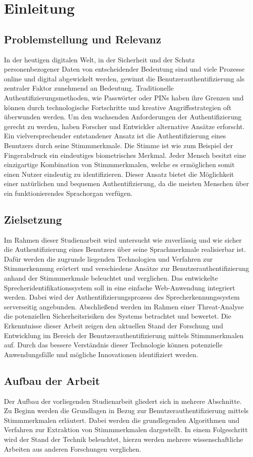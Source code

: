 \section{Einleitung}
\subsection{Problemstellung und Relevanz}
In der heutigen digitalen Welt, in der Sicherheit und der Schutz personenbezogener Daten von entscheidender Bedeutung sind und viele Prozesse online und digital abgewickelt werden, gewinnt die Benutzerauthentifizierung als zentraler Faktor zunehmend an Bedeutung.
Traditionelle Authentifizierungsmethoden, wie Passwörter oder PINs haben ihre Grenzen und können durch technologische Fortschritte und kreative Angriffsstrategien oft überwunden werden.
Um den wachsenden Anforderungen der Authentifizierung gerecht zu werden, haben Forscher und Entwickler alternative Ansätze erforscht.
\newparagraph
Ein vielversprechender entstandener Ansatz ist die Authentifizierung eines Benutzers durch seine Stimmmerkmale.
Die Stimme ist wie zum Beispiel der Fingerabdruck ein eindeutiges biometrisches Merkmal.
Jeder Mensch besitzt eine einzigartige Kombination von Stimmmerkmalen, welche es ermöglichen somit einen Nutzer eindeutig zu identifizieren.
Dieser Ansatz bietet die Möglichkeit einer natürlichen und bequemen Authentifizierung, da die meisten Menschen über ein funktionierendes Sprachorgan verfügen.

\subsection{Zielsetzung}
Im Rahmen dieser Studienarbeit wird untersucht wie zuverlässig und wie sicher die Authentifizierung eines Benutzers über seine Sprachmerkmale realisierbar ist.
Dafür werden die zugrunde liegenden Technologien und Verfahren zur Stimmerkennung erörtert und verschiedene Ansätze zur Benutzerauthentifizierung anhand der Stimmmerkmale beleuchtet und verglichen.
Das entwickelte Sprecheridentifikationssystem soll in eine einfache Web-Anwendung integriert werden.
Dabei wird der Authentifizierungsprozess des Sprecherkennungssystem serverseitig angebunden.
Abschließend werden im Rahmen einer Threat-Analyse die potenziellen Sicherheitsrisiken des Systems betrachtet und bewertet.
\newparagraph
Die Erkenntnisse dieser Arbeit zeigen den aktuellen Stand der Forschung und Entwicklung im Bereich der Benutzerauthentifizierung mittels Stimmmerkmalen auf.
Durch das bessere Verständnis dieser Technologie können potenzielle Anwendungsfälle und mögliche Innovationen identifiziert werden.

\subsection{Aufbau der Arbeit}
Der Aufbau der vorliegenden Studienarbeit gliedert sich in mehrere Abschnitte.
Zu Beginn werden die Grundlagen in Bezug zur Benutzerauthentifizierung mittels Stimmmerkmalen erläutert.
Dabei werden die grundlegenden Algorithmen und Verfahren zur Extraktion von Stimmmerkmalen dargestellt.
In einem Folgeschritt wird der Stand der Technik beleuchtet, hierzu werden mehrere wissenschaftliche Arbeiten aus anderen Forschungen verglichen.
